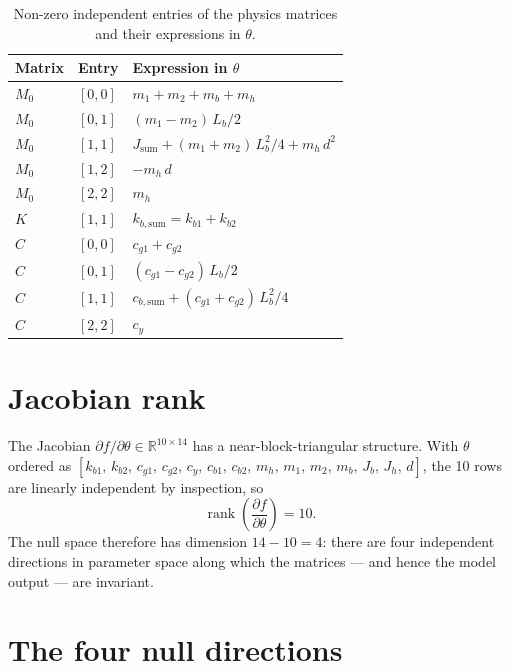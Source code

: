 \documentclass[11pt,a4paper]{article}
\begin{document}
\begin{table}[h]
\centering
\caption{Non-zero independent entries of the physics matrices and their
         expressions in $\theta$.}
\label{tab:observable_map}
\begin{tabular}{llp{7cm}}
\toprule
Matrix & Entry & Expression in $\theta$ \\
\midrule
$M_0$ & $[0,0]$ & $m_1 + m_2 + m_b + m_h$ \\
$M_0$ & $[0,1]$ & $(m_1 - m_2)\,L_b/2$ \\
$M_0$ & $[1,1]$ & $J_\mathrm{sum} + (m_1+m_2)\,L_b^2/4 + m_h\,d^2$ \\
$M_0$ & $[1,2]$ & $-m_h\,d$ \\
$M_0$ & $[2,2]$ & $m_h$ \\
$K$   & $[1,1]$ & $k_{b,\mathrm{sum}} = k_{b1}+k_{b2}$ \\
$C$   & $[0,0]$ & $c_{g1}+c_{g2}$ \\
$C$   & $[0,1]$ & $(c_{g1}-c_{g2})\,L_b/2$ \\
$C$   & $[1,1]$ & $c_{b,\mathrm{sum}} + (c_{g1}+c_{g2})\,L_b^2/4$ \\
$C$   & $[2,2]$ & $c_y$ \\
\bottomrule
\end{tabular}
\end{table}

\section{Jacobian rank}

The Jacobian
$\partial f/\partial\theta \in \mathbb{R}^{10\times14}$
has a near-block-triangular structure.
With $\theta$ ordered as
$[k_{b1},\,k_{b2},\,c_{g1},\,c_{g2},\,c_y,\,c_{b1},\,c_{b2},\,m_h,\,m_1,\,m_2,\,m_b,\,J_b,\,J_h,\,d]$,
the 10 rows are linearly independent by inspection, so
\begin{equation}
    \operatorname{rank}\!\left(\frac{\partial f}{\partial\theta}\right) = 10.
\end{equation}
The null space therefore has dimension $14 - 10 = 4$: there are four
independent directions in parameter space along which the matrices — and
hence the model output — are invariant.

\section{The four null directions}
\end{document}
